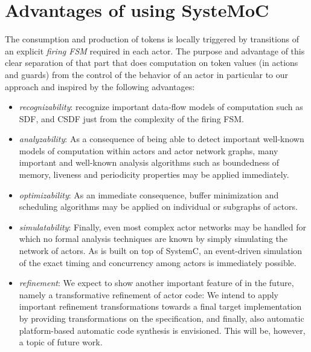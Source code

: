 \section{Advantages of using SysteMoC}
The consumption and production of tokens is locally triggered by transitions 
of an explicit \emph{firing FSM} required in each actor.
The purpose and advantage of this clear separation of that part 
that does computation on token values (in 
actions and guards) from the control of the behavior of an actor in particular 
to our \SysteMoC{} approach and inspired by the following advantages: 
\begin{itemize}
\item {\em recognizability}: recognize important data-flow models of computation such 
as SDF, and CSDF just from the complexity of the firing FSM.
\item {\em analyzability}: As a consequence of being able to detect important 
well-known models of computation within \SysteMoC{} actors and actor network 
graphs, many important and well-known analysis algorithms such as 
boundedness of memory, liveness and periodicity properties may be applied
immediately.
\item {\em optimizability}: As an immediate consequence, buffer minimization 
and scheduling algorithms may be applied on individual or subgraphs of actors.
\item {\em simulatability}: Finally, even most complex actor networks may be 
handled for which no formal analysis techniques are known by simply simulating the 
network of actors. As \SysteMoC{} is built on top of SystemC, an event-driven 
simulation of the exact timing and concurrency among actors is immediately possible.
\item {\em refinement}: We expect to show another important 
feature of \SysteMoC{} in the future, namely a transformative refinement of actor code:
We intend to apply important refinement transformations towards a final 
target implementation by providing transformations on the specification, 
and finally, also automatic platform-based automatic code synthesis is envisioned.
This will be, however, a topic of future work. 
\end{itemize} 

